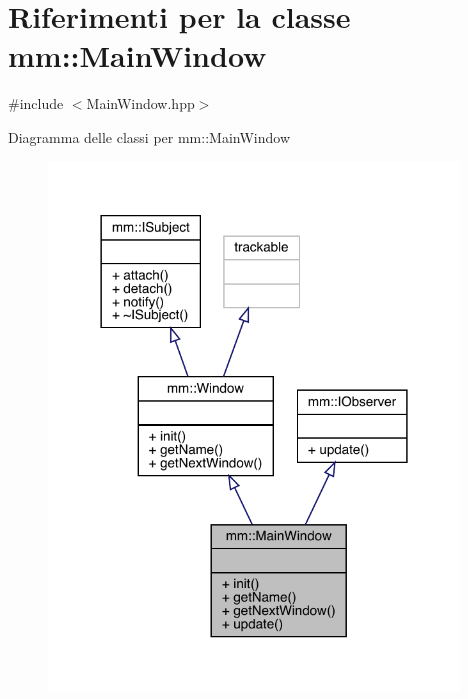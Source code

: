 \hypertarget{classmm_1_1_main_window}{}\section{Riferimenti per la classe mm\+:\+:Main\+Window}
\label{classmm_1_1_main_window}


{\ttfamily \#include $<$Main\+Window.\+hpp$>$}



Diagramma delle classi per mm\+:\+:Main\+Window\nopagebreak
\begin{figure}[H]
\begin{center}
\leavevmode
\includegraphics[width=309pt]{da/d0e/classmm_1_1_main_window__inherit__graph}
\end{center}
\end{figure}


